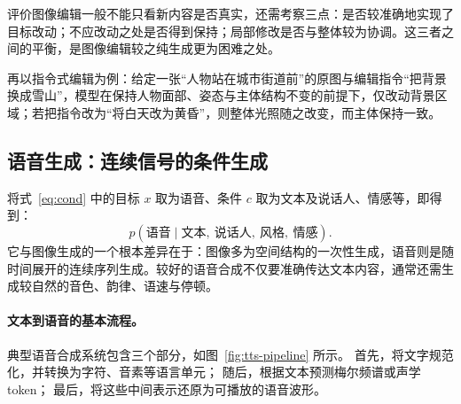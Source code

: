 \begin{importantnote}
  评价图像编辑一般不能只看新内容是否真实，还需考察三点：是否较准确地实现了目标改动；不应改动之处是否得到保持；局部修改是否与整体较为协调。这三者之间的平衡，是图像编辑较之纯生成更为困难之处。
\end{importantnote}

再以指令式编辑为例：给定一张“人物站在城市街道前”的原图与编辑指令“把背景换成雪山”，模型在保持人物面部、姿态与主体结构不变的前提下，仅改动背景区域；若把指令改为“将白天改为黄昏”，则整体光照随之改变，而主体保持一致。

\subsection{语音生成：连续信号的条件生成}
\label{sub:tts}

将式~\eqref{eq:cond} 中的目标 $x$ 取为语音、条件 $c$ 取为文本及说话人、情感等，即得到：
\begin{equation}
  p(\text{语音}\mid \text{文本},\ \text{说话人},\ \text{风格},\ \text{情感}).
\end{equation}
它与图像生成的一个根本差异在于：图像多为空间结构的一次性生成，语音则是随时间展开的连续序列生成。较好的语音合成不仅要准确传达文本内容，通常还需生成较自然的音色、韵律、语速与停顿。

\paragraph{文本到语音的基本流程。}
典型语音合成系统包含三个部分，如图~\ref{fig:tts-pipeline} 所示。
首先，将文字规范化，并转换为字符、音素等语言单元；
随后，根据文本预测梅尔频谱或声学 token；
最后，将这些中间表示还原为可播放的语音波形。

